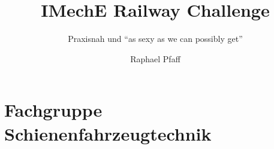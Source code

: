 \documentclass[slidestop,compress,mathserif, aspectratio = 169]{beamer}
\begin{document}
\newcommand{\source}[1]{\rotatebox{90}{\tiny \color{gray} #1}}

\newcommand{\done}{${\color{teal}\checkmark}$}

\title{IMechE Railway Challenge}
\subtitle{Praxisnah und ``as sexy as we can possibly get''}
\author{Raphael Pfaff}





\frame{\titlepage}

\section{Fachgruppe Schienenfahrzeugtechnik}

\usebackgroundtemplate{}
\end{document}
